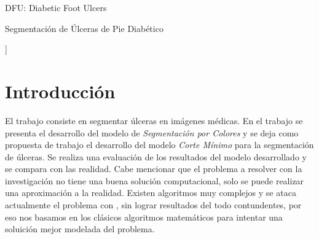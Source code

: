 \documentclass[a4paper,10pt,twocolumn]{article}
\begin{document}
\begin{keywords}
DFU: Diabetic Foot Ulcers

\end{keywords}

\begin{topics}
Segmentaci\'on de \'Ulceras de Pie Diab\'etico
\end{topics}


\vspace{0.8cm}
]



\section{Introducción}\label{sec:intro}


El trabajo consiste en segmentar \'ulceras en im\'agenes m\'edicas. En el trabajo se presenta el desarrollo
del modelo de \textit{Segmentaci\'on por Colores} y se deja como propuesta de trabajo el desarrollo del modelo
\textit{Corte M\'inimo} para la segmentaci\'on de \'ulceras. Se realiza una evaluaci\'on de los resultados del modelo desarrollado
y se compara con las realidad. Cabe mencionar que el problema a resolver con la investigaci\'on no tiene una buena soluci\'on
computacional, solo se puede realizar una aproximaci\'on a la realidad. Existen algoritmos muy complejos y se ataca actualmente el problema con
, sin lograr resultados del todo contundentes, por eso nos basamos en los cl\'asicos algoritmos matem\'aticos para intentar 
una soluici\'on mejor modelada del problema. 
\end{document}
